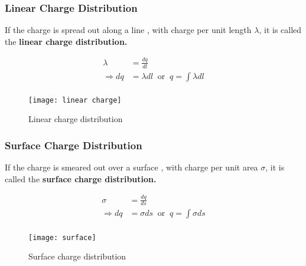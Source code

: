 \subsubsection{Linear Charge Distribution}
If the charge is spread out along a line , with charge per unit length $\lambda$, it is called the \textbf{linear charge distribution.}\\
\begin{minipage}{0.45\textwidth}
	\begin{align*}
	\lambda&=\frac{dq}{d l}\\
	\Longrightarrow d q&=\lambda d l \ \text { or }\ q=\int \lambda d l\\
	\end{align*}
\end{minipage}\hfil
\begin{minipage}{0.45\textwidth}
	\begin{figure}[H]
		\centering
		\texttt{[image: linear charge]}
		\caption{Linear charge distribution}
		\label{linear}
	\end{figure}
\end{minipage}

\subsubsection{Surface Charge Distribution}
If the charge is smeared out over a surface , with charge per unit area $\sigma$, it is called the \textbf{surface charge distribution.}\newline
\begin{minipage}{0.45\textwidth}
\begin{align*}
\sigma&=\frac{dq}{d s}\\
\Longrightarrow d q&=\sigma d s\ \text { or }\ q=\int \sigma d s\\
\end{align*}
\end{minipage}\hfill
\begin{minipage}{0.45\textwidth}
	\begin{figure}[H]
		\centering
		\texttt{[image: surface]}
		\caption{Surface charge distribution}
		\label{rc current discharge}
	\end{figure}
	
\end{minipage}

